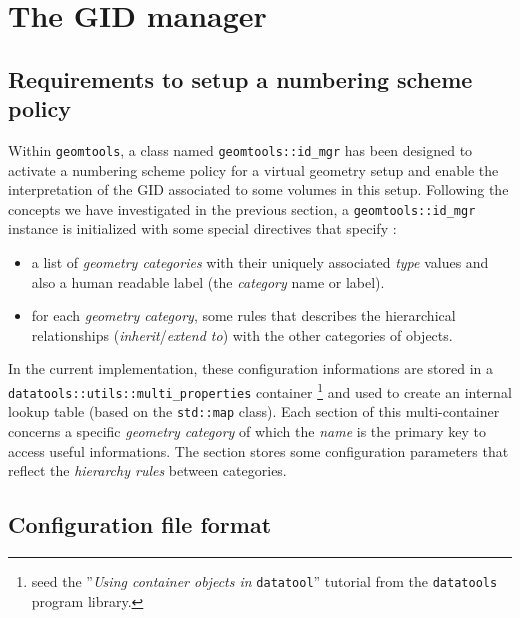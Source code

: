 
\section{The GID manager}

\subsection{Requirements to setup a numbering scheme policy}

\pn Within \texttt{geomtools},  a class named \verb+geomtools::id_mgr+
has been designed to activate  a numbering scheme policy for a virtual
geometry setup and enable the  interpretation of the GID associated to
some volumes  in this setup. Following the concepts we have investigated
in the previous section, a \verb+geomtools::id_mgr+
instance is initialized with some special directives that specify :

\begin{itemize}

\item  a  list  of  \emph{geometry  categories}  with  their  uniquely
  associated \emph{type}  values and also a human  readable label (the
  \emph{category} name or  label). 

\item for each \emph{geometry category}, some rules that describes the
  hierarchical relationships (\emph{inherit}/\emph{extend to}) 
  with the other categories of objects.

\end{itemize}

\pn  In the current  implementation, these  configuration informations
are   stored  in  a   \\  \texttt{datatools::utils::multi\_properties}
container  \footnote{seed  the  ''\emph{Using  container  objects  in}
  \texttt{datatool}''  tutorial  from  the \texttt{datatools}  program
  library.}  and used to create an internal lookup table (based on the
\texttt{std::map}  class).   Each   section  of  this  multi-container
concerns a specific \emph{geometry  category} of which the \emph{name}
is the primary  key to access useful informations.   The section stores
some configuration parameters  that reflect the \emph{hierarchy rules}
between categories.


\subsection{Configuration file format}

